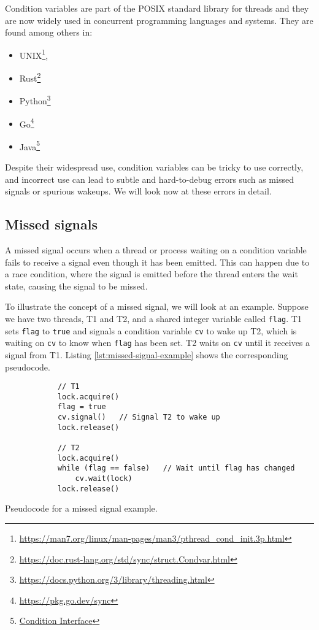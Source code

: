 \documentclass[../Thesis.tex]{subfiles}
\begin{document}
Condition variables are part of the POSIX standard library for threads \cite{nichols1996pthreads}
and they are now widely used in concurrent programming languages and systems.
They are found among others in:

\begin{itemize}
      \item UNIX\footnote{\url{https://man7.org/linux/man-pages/man3/pthread_cond_init.3p.html}},
      \item Rust\footnote{\url{https://doc.rust-lang.org/std/sync/struct.Condvar.html}}
      \item Python\footnote{\url{https://docs.python.org/3/library/threading.html}}
      \item Go\footnote{\url{https://pkg.go.dev/sync}}
      \item Java\footnote{
                  \href{https://docs.oracle.com/en/java/javase/20/docs/api/java.base/java/util/concurrent/locks/Condition.html}
                  {Condition Interface}}
\end{itemize}

Despite their widespread use, condition variables can be tricky to use correctly,
and incorrect use can lead to subtle and
hard-to-debug errors such as missed signals or spurious wakeups.
We will look now at these errors in detail.

\subsection{Missed signals}

A missed signal occurs when a thread or process waiting on a condition variable
fails to receive a signal even though it has been emitted.
This can happen due to a race condition, where the signal is emitted
before the thread enters the wait state, causing the signal to be missed.

To illustrate the concept of a missed signal, we will look at an example.
Suppose we have two threads, T1 and T2,
and a shared integer variable called \texttt{flag}.
T1 sets \texttt{flag} to \texttt{true} and signals
a condition variable \texttt{cv} to wake up T2,
which is waiting on \texttt{cv} to know when \texttt{flag} has been set.
T2 waits on \texttt{cv} until it receives a signal from T1.
Listing \ref{lst:missed-signal-example} shows the corresponding pseudocode.

\begin{listing}
      \begin{verbatim}
            // T1
            lock.acquire()
            flag = true
            cv.signal()   // Signal T2 to wake up
            lock.release()
            
            // T2
            lock.acquire()
            while (flag == false)   // Wait until flag has changed
                cv.wait(lock)
            lock.release()
      \end{verbatim}
      \caption{Pseudocode for a missed signal example.}
      \label{lst:missed-signal-example}
\end{listing}
\end{document}
